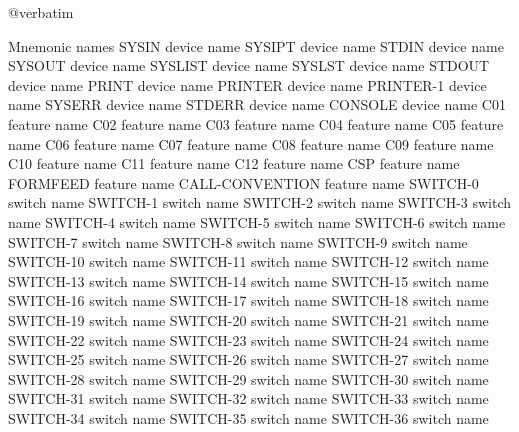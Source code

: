 @verbatim

Mnemonic names
SYSIN                           device name
SYSIPT                          device name
STDIN                           device name
SYSOUT                          device name
SYSLIST                         device name
SYSLST                          device name
STDOUT                          device name
PRINT                           device name
PRINTER                         device name
PRINTER-1                       device name
SYSERR                          device name
STDERR                          device name
CONSOLE                         device name
C01                             feature name
C02                             feature name
C03                             feature name
C04                             feature name
C05                             feature name
C06                             feature name
C07                             feature name
C08                             feature name
C09                             feature name
C10                             feature name
C11                             feature name
C12                             feature name
CSP                             feature name
FORMFEED                        feature name
CALL-CONVENTION                 feature name
SWITCH-0                        switch name
SWITCH-1                        switch name
SWITCH-2                        switch name
SWITCH-3                        switch name
SWITCH-4                        switch name
SWITCH-5                        switch name
SWITCH-6                        switch name
SWITCH-7                        switch name
SWITCH-8                        switch name
SWITCH-9                        switch name
SWITCH-10                       switch name
SWITCH-11                       switch name
SWITCH-12                       switch name
SWITCH-13                       switch name
SWITCH-14                       switch name
SWITCH-15                       switch name
SWITCH-16                       switch name
SWITCH-17                       switch name
SWITCH-18                       switch name
SWITCH-19                       switch name
SWITCH-20                       switch name
SWITCH-21                       switch name
SWITCH-22                       switch name
SWITCH-23                       switch name
SWITCH-24                       switch name
SWITCH-25                       switch name
SWITCH-26                       switch name
SWITCH-27                       switch name
SWITCH-28                       switch name
SWITCH-29                       switch name
SWITCH-30                       switch name
SWITCH-31                       switch name
SWITCH-32                       switch name
SWITCH-33                       switch name
SWITCH-34                       switch name
SWITCH-35                       switch name
SWITCH-36                       switch name

